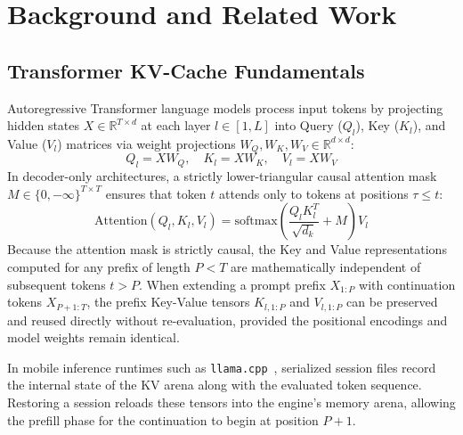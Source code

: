 \section{Background and Related Work}
\label{sec:background_related}

\subsection{Transformer KV-Cache Fundamentals}
Autoregressive Transformer language models process input tokens by projecting hidden states $X \in \mathbb{R}^{T \times d}$ at each layer $l \in [1, L]$ into Query ($Q_l$), Key ($K_l$), and Value ($V_l$) matrices via weight projections $W_Q, W_K, W_V \in \mathbb{R}^{d \times d}$:
\begin{equation}
    Q_l = X W_Q, \quad K_l = X W_K, \quad V_l = X W_V
\end{equation}
In decoder-only architectures, a strictly lower-triangular causal attention mask $M \in \{0, -\infty\}^{T \times T}$ ensures that token $t$ attends only to tokens at positions $\tau \le t$:
\begin{equation}
    \text{Attention}(Q_l, K_l, V_l) = \text{softmax}\left(\frac{Q_l K_l^T}{\sqrt{d_k}} + M\right) V_l
\end{equation}
Because the attention mask is strictly causal, the Key and Value representations computed for any prefix of length $P < T$ are mathematically independent of subsequent tokens $t > P$. When extending a prompt prefix $X_{1:P}$ with continuation tokens $X_{P+1:T}$, the prefix Key-Value tensors $K_{l, 1:P}$ and $V_{l, 1:P}$ can be preserved and reused directly without re-evaluation, provided the positional encodings and model weights remain identical.

In mobile inference runtimes such as \texttt{llama.cpp}~\cite{gerganov2023llamacpp}, serialized session files record the internal state of the KV arena along with the evaluated token sequence. Restoring a session reloads these tensors into the engine's memory arena, allowing the prefill phase for the continuation to begin at position $P+1$.

